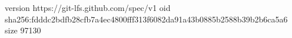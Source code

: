 version https://git-lfs.github.com/spec/v1
oid sha256:fdddc2bdfb28cfb7a4ec4800fff313f6082da91a43b0885b2588b39b2b6ca5a6
size 97130
